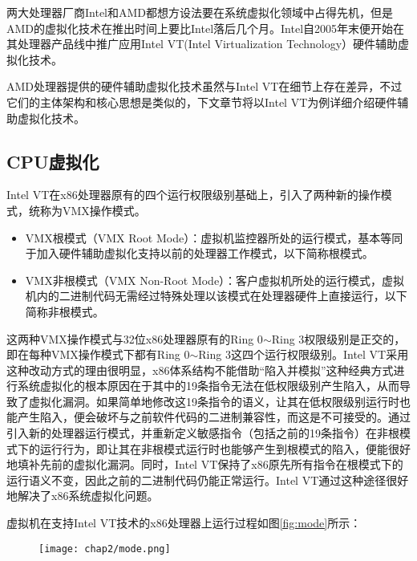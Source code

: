 两大处理器厂商Intel和AMD都想方设法要在系统虚拟化领域中占得先机，但是AMD的虚拟化技术在推出时间上要比Intel落后几个月。Intel自2005年末便开始在其处理器产品线中推广应用Intel VT(Intel Virtualization Technology）硬件辅助虚拟化技术。

AMD处理器提供的硬件辅助虚拟化技术虽然与Intel VT在细节上存在差异，不过它们的主体架构和核心思想是类似的，下文章节将以Intel VT为例详细介绍硬件辅助虚拟化技术。

\subsection{CPU虚拟化}

Intel VT在x86处理器原有的四个运行权限级别基础上，引入了两种新的操作模式，统称为VMX操作模式。

\begin{itemize}
\item VMX根模式（VMX Root Mode）：虚拟机监控器所处的运行模式，基本等同于加入硬件辅助虚拟化支持以前的处理器工作模式，以下简称根模式。
\item VMX非根模式（VMX Non-Root Mode）：客户虚拟机所处的运行模式，虚拟机内的二进制代码无需经过特殊处理以该模式在处理器硬件上直接运行，以下简称非根模式。
\end{itemize}

这两种VMX操作模式与32位x86处理器原有的Ring 0$\sim$Ring 3权限级别是正交的，即在每种VMX操作模式下都有Ring 0$\sim$Ring 3这四个运行权限级别。Intel VT采用这种改动方式的理由很明显，x86体系结构不能借助``陷入并模拟''这种经典方式进行系统虚拟化的根本原因在于其中的19条指令无法在低权限级别产生陷入，从而导致了虚拟化漏洞。如果简单地修改这19条指令的语义，让其在低权限级别运行时也能产生陷入，便会破坏与之前软件代码的二进制兼容性，而这是不可接受的。通过引入新的处理器运行模式，并重新定义敏感指令（包括之前的19条指令）在非根模式下的运行行为，即让其在非根模式运行时也能够产生到根模式的陷入，便能很好地填补先前的虚拟化漏洞。同时，Intel VT保持了x86原先所有指令在根模式下的运行语义不变，因此之前的二进制代码仍能正常运行。Intel VT通过这种途径很好地解决了x86系统虚拟化问题。

虚拟机在支持Intel VT技术的x86处理器上运行过程如图\ref{fig:mode}所示：

\begin{figure}[!htbp]
  \centering
  \texttt{[image: chap2/mode.png]}
\end{figure}


